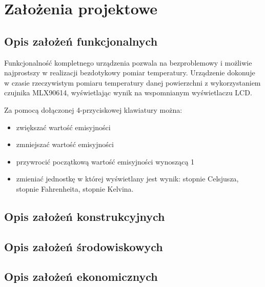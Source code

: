 \chapter{Założenia projektowe}

    \section{Opis założeń funkcjonalnych}

    Funkcjonalność kompletnego urządzenia pozwala na bezproblemowy i możliwie najprostszy w realizacji bezdotykowy pomiar temperatury. Urządzenie dokonuje w czasie rzeczywistym pomiaru temperatury danej powierzchni z wykorzystaniem czujnika MLX90614, wyświetlając wynik na wspomnianym wyświetlaczu LCD. 
    
    \vspace{12pt}

    Za pomocą dołączonej 4-przyciskowej klawiatury można:

    \begin{itemize}

        \item zwiększać wartość emisyjności
        \item zmniejszać wartość emisyjności
        \item przywrocić początkową wartość emisyjności wynoszącą 1
        \item zmieniać jednostkę w której wyświetlany jest wynik: stopnie Celsjusza, stopnie Fahrenheita, stopnie Kelvina.

    \end{itemize}

    \section{Opis założeń konstrukcyjnych}
    
    

    \section{Opis założeń środowiskowych}
    
    

    \section{Opis założeń ekonomicznych}